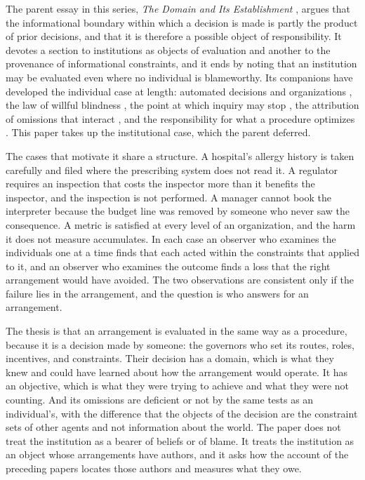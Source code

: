 \documentclass[11pt]{article}
\theoremstyle{plain}
\theoremstyle{definition}
\begin{document}
The parent essay in this series, \emph{The Domain and Its Establishment} \cite{flyxion2026domain}, argues that the informational boundary within which a decision is made is partly the product of prior decisions, and that it is therefore a possible object of responsibility. It devotes a section to institutions as objects of evaluation and another to the provenance of informational constraints, and it ends by noting that an institution may be evaluated even where no individual is blameworthy. Its companions have developed the individual case at length: automated decisions and organizations \cite{flyxion2026inputs}, the law of willful blindness \cite{flyxion2026law}, the point at which inquiry may stop \cite{flyxion2026stop}, the attribution of omissions that interact \cite{flyxion2026shared}, and the responsibility for what a procedure optimizes \cite{flyxion2026objective}. This paper takes up the institutional case, which the parent deferred.

The cases that motivate it share a structure. A hospital's allergy history is taken carefully and filed where the prescribing system does not read it. A regulator requires an inspection that costs the inspector more than it benefits the inspector, and the inspection is not performed. A manager cannot book the interpreter because the budget line was removed by someone who never saw the consequence. A metric is satisfied at every level of an organization, and the harm it does not measure accumulates. In each case an observer who examines the individuals one at a time finds that each acted within the constraints that applied to it, and an observer who examines the outcome finds a loss that the right arrangement would have avoided. The two observations are consistent only if the failure lies in the arrangement, and the question is who answers for an arrangement.

The thesis is that an arrangement is evaluated in the same way as a procedure, because it is a decision made by someone: the governors who set its routes, roles, incentives, and constraints. Their decision has a domain, which is what they knew and could have learned about how the arrangement would operate. It has an objective, which is what they were trying to achieve and what they were not counting. And its omissions are deficient or not by the same tests as an individual's, with the difference that the objects of the decision are the constraint sets of other agents and not information about the world. The paper does not treat the institution as a bearer of beliefs or of blame. It treats the institution as an object whose arrangements have authors, and it asks how the account of the preceding papers locates those authors and measures what they owe.
\end{document}
